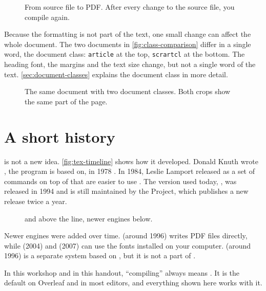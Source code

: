 \begin{figure}[htbp]
    \centering
    
    \caption{From source file to PDF. After every change to the source file, you compile again.}
    \label{fig:pipeline}
\end{figure}

Because the formatting is not part of the text, one small change can affect the whole document.
The two documents in \autoref{fig:class-comparison} differ in a single word, the document class:
\texttt{article} at the top, \texttt{scrartcl} at the bottom.
The heading font, the margins and the text size change, but not a single word of the text.
\autoref{sec:document-classes} explains the document class in more detail.

\begin{figure}[htbp]
    \centering
    \caption{The same document with two document classes. Both crops show the same part of the page.}
    \label{fig:class-comparison}
\end{figure}

\section{A short history}\label{sec:history}

 is not a new idea.
\autoref{fig:tex-timeline} shows how it developed.
Donald Knuth wrote , the program  is based on, in 1978 \parencite{knuth1984}.
In 1984, Leslie Lamport released  as a set of commands on top of  that are easier to use \parencite{lamport1994}.
The version used today, , was released in 1994 and is still maintained by the  Project,
which publishes a new release twice a year.

\begin{figure}[htbp]
    \centering
    \newcommand{\timelineunit}{0.32cm}
    
    \caption{ and  above the line, newer engines below.}
    \label{fig:tex-timeline}
\end{figure}

Newer engines were added over time.
 (around 1996) writes PDF files directly,
while  (2004) and  (2007) can use the fonts installed on your computer.
 (around 1996) is a separate system based on , but it is not a part of .

In this workshop and in this handout, \enquote{compiling} always means .
It is the default on Overleaf and in most editors,
and everything shown here works with it.
